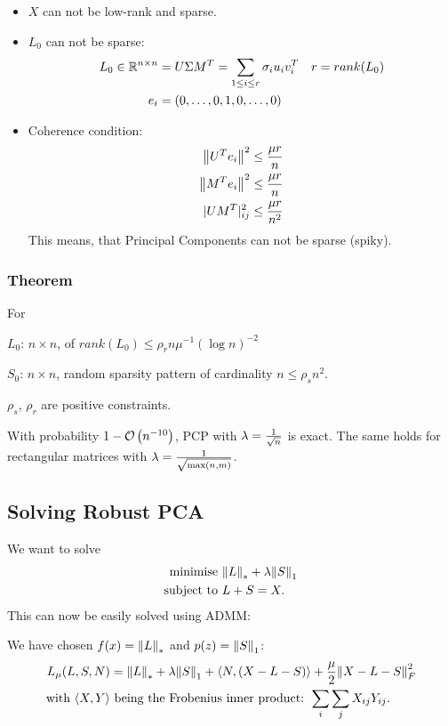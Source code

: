 \begin{itemize}
    \item $X$ can not be low-rank and sparse.
    \item $L_0$ can not be sparse:
        \begin{align*}
            L_0 \in \mathbb{R}^{n\times n} &= U\Sigma M^T = \sum_{1\leq i\leq r} \sigma_i u_i v_i^T &r = rank(L_0)\\
            e_i &= (0,\ldots,0,1,0,\ldots,0)
        \end{align*}
    \item Coherence condition:
        \begin{align*}
            \left\lVert U^T e_i\right\rVert^2 &\leq {\mu r\over n}\\
            \left\lVert M^T e_i\right\rVert^2 &\leq {\mu r\over n}\\
            |UM^T|_{ij}^2 &\leq {\mu r\over n^2}
        \end{align*}
        This means, that Principal Components can not be sparse (spiky).
\end{itemize}

\subsubsection{Theorem}
For 
\begin{description}
\item $L_0$: $n \times n$, of $rank(L_0) \leq \rho_r n\mu^{-1}(\log n)^{-2}$
\item $S_0$: $n \times n$, random sparsity pattern of cardinality $n\leq \rho_s n^2$.

    $\rho_s$, $\rho_r$ are positive constraints.
\end{description}
With probability $1-\mathcal O\left(n^{-10}\right)$, PCP with $\lambda = {1\over \sqrt{n}}$ is exact.
The same holds for rectangular matrices with $\lambda= {1\over \sqrt{\max(n,m)}}$.

\subsection{Solving Robust PCA}
We want to solve
\begin{align*}
    \text{minimise}\ &\norm{L}_* + \lambda \norm{S}_1\\
    \text{subject to}\ &L+S=X.
\end{align*}
This can now be easily solved using ADMM:

We have chosen $f(x) = \left\lVert L\right\rVert_*$ and $p(z) = \left\lVert S\right\rVert_1$:
\begin{align*}
    L_\mu (L,S,N) &= \norm{L}_* +\lambda \norm{S}_1 + \langle N, (X-L-S)\rangle +{\mu\over 2} \norm{X-L-S}_F^2\\
    \text{with }\langle X,Y\rangle &\text{ being the Frobenius inner product: }\sum_i\sum_j X_{ij}Y_{ij}.
\end{align*}

